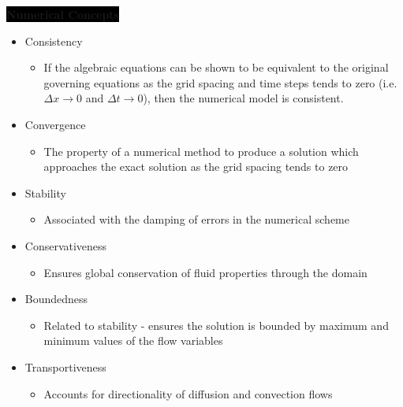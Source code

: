 \colorbox{black}{\textbf{\color{white}Numerical Concepts}}
\begin{itemize}
    \item Consistency
    \begin{itemize}
        \item If the algebraic equations can be shown to be equivalent to the original governing equations as the grid spacing and time steps tends to zero (i.e. $\Delta x \to 0$ and $\Delta t \to 0$), then the numerical model is consistent.
    \end{itemize}
    \item Convergence 
    \begin{itemize}
        \item The property of a numerical method to produce a solution which approaches the exact solution as the grid spacing tends to zero
    \end{itemize}
    \item Stability
    \begin{itemize}
        \item Associated with the damping of errors in the numerical scheme
    \end{itemize}
    \item Conservativeness
    \begin{itemize}
        \item Ensures global conservation of fluid properties through the domain
    \end{itemize}
    \item Boundedness
    \begin{itemize}
        \item Related to stability - ensures the solution is bounded by maximum and minimum values of the flow variables
    \end{itemize}
    \item Transportiveness
    \begin{itemize}
        \item Accounts for directionality of diffusion and convection flows
    \end{itemize}
\end{itemize}

